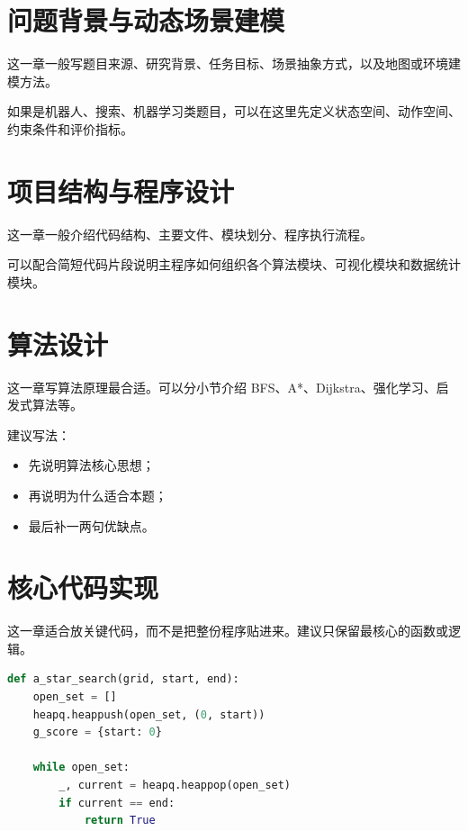 \documentclass[
  oneside,
  degree=bachelor,
  fullwidthstop=false,
  fontset=none,
  times=false,
  minted=false,
  biblatex=false,
]{tongjithesis}
\begin{document}
\major{}
\thesisdate{\the\year}{\the\month}{\the\day}

\MakeCover
\cleardoublepage

\tableofcontents
\cleardoublepage

\mainmatter

\chapter{问题背景与动态场景建模}
这一章一般写题目来源、研究背景、任务目标、场景抽象方式，以及地图或环境建模方法。

如果是机器人、搜索、机器学习类题目，可以在这里先定义状态空间、动作空间、约束条件和评价指标。

\chapter{项目结构与程序设计}
这一章一般介绍代码结构、主要文件、模块划分、程序执行流程。

可以配合简短代码片段说明主程序如何组织各个算法模块、可视化模块和数据统计模块。

\chapter{算法设计}
这一章写算法原理最合适。可以分小节介绍 BFS、A*、Dijkstra、强化学习、启发式算法等。

建议写法：
\begin{itemize}
  \item 先说明算法核心思想；
  \item 再说明为什么适合本题；
  \item 最后补一两句优缺点。
\end{itemize}

\chapter{核心代码实现}
这一章适合放关键代码，而不是把整份程序贴进来。建议只保留最核心的函数或逻辑。

\begin{lstlisting}[language=Python,caption={示例：A* 搜索框架}]
def a_star_search(grid, start, end):
    open_set = []
    heapq.heappush(open_set, (0, start))
    g_score = {start: 0}

    while open_set:
        _, current = heapq.heappop(open_set)
        if current == end:
            return True
\end{lstlisting}
\end{document}
